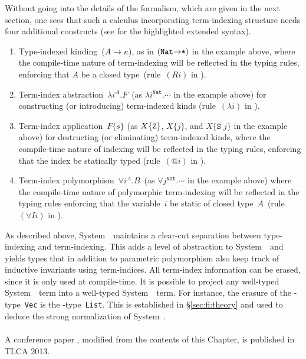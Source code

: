 Without going into the details of the formalism, which are given in the
next section, one sees that such a calculus incorporating term-indexing
structure needs four additional constructs (see  for the
highlighted extended syntax).
\begin{enumerate}
\item
  Type-indexed kinding~($A\to\kappa$), as in $(\texttt{{Nat}\ensuremath{\to}*})$
  in the example above, where the compile-time nature of term-indexing
  will be reflected in the typing rules, enforcing that $A$ be a closed
  type~(rule~$(Ri)$ in ).

\item 
  Term-index abstraction~$\lambda i^A.F$~(as
  $\lambda i^{\texttt{{Nat}}}.\cdots$ in the example above) for constructing
  (or introducing) term-indexed kinds (rule~$(\lambda i)$ in ).

\item 
  Term-index application~$F\{s\}$ (as $X\{{\tt Z}\}$, $X\{j\}$, and
  $X\{\texttt{S}\;j\}$ in the example above) for destructing (or
  eliminating) term-indexed kinds, where the compile-time nature of
  indexing will be reflected in the typing rules, enforcing that the index be
  statically typed (rule~$(@i)$ in ).

\item
  Term-index polymorphism~$\forall i^A.B$~(as
  $\forall j^{\texttt{{Nat}}}.\cdots$ in the example above)
  where the compile-time nature of polymorphic term-indexing
  will be reflected in the typing rules enforcing that the variable~$i$
  be static of closed type~$A$~(rule~$(\forall Ii)$ in ).
\end{enumerate}

As described above, System~\Fi\ maintains a clear-cut separation between
type-indexing and term-indexing.  This adds a level of abstraction
to System~\Fw\ and yields types that in addition to parametric polymorphism
also keep track of inductive invariants using term-indices. All term-index
information can be erased, since it is only used at compile-time.  
It is possible to project any well-typed System~\Fi\ term into
a well-typed System~\Fw\ term.
For instance, the erasure of the \Fi-type~\texttt{Vec}
is the \Fw-type~\texttt{List}.  This is established in
\S\ref{sec:fi:theory} and used to deduce the strong normalization of
System~\Fi.

\paragraph{}
A conference paper \cite{AhnSheFioPit13}, modified from
the contents of this Chapter, is published in TLCA 2013.






